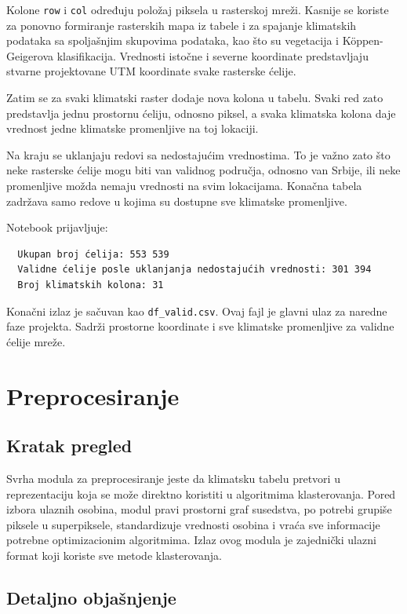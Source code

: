 \documentclass[11pt]{article}
\begin{document}
Kolone \texttt{row} i \texttt{col} određuju položaj piksela u rasterskoj mreži. Kasnije se koriste za ponovno formiranje rasterskih mapa iz tabele i za spajanje klimatskih podataka sa spoljašnjim skupovima podataka, kao što su vegetacija i Köppen-Geigerova klasifikacija. Vrednosti istočne i severne koordinate predstavljaju stvarne projektovane UTM koordinate svake rasterske ćelije.

Zatim se za svaki klimatski raster dodaje nova kolona u tabelu. Svaki red zato predstavlja jednu prostornu ćeliju, odnosno piksel, a svaka klimatska kolona daje vrednost jedne klimatske promenljive na toj lokaciji.

Na kraju se uklanjaju redovi sa nedostajućim vrednostima. To je važno zato što neke rasterske ćelije mogu biti van validnog područja, odnosno van Srbije, ili neke promenljive možda nemaju vrednosti na svim lokacijama. Konačna tabela zadržava samo redove u kojima su dostupne sve klimatske promenljive.

Notebook prijavljuje:
\begin{verbatim}
  Ukupan broj ćelija: 553 539
  Validne ćelije posle uklanjanja nedostajućih vrednosti: 301 394
  Broj klimatskih kolona: 31
\end{verbatim}

Konačni izlaz je sačuvan kao \texttt{df\_valid.csv}. Ovaj fajl je glavni ulaz za naredne faze projekta. Sadrži prostorne koordinate i sve klimatske promenljive za validne ćelije mreže.

\section{Preprocesiranje}
\label{sec:preprocessing}

\subsection{Kratak pregled}
Svrha modula za preprocesiranje jeste da klimatsku tabelu pretvori u reprezentaciju koja se može direktno koristiti u algoritmima klasterovanja. Pored izbora ulaznih osobina, modul pravi prostorni graf susedstva, po potrebi grupiše piksele u superpiksele, standardizuje vrednosti osobina i vraća sve informacije potrebne optimizacionim algoritmima. Izlaz ovog modula je zajednički ulazni format koji koriste sve metode klasterovanja.

\subsection{Detaljno objašnjenje}
\end{document}
